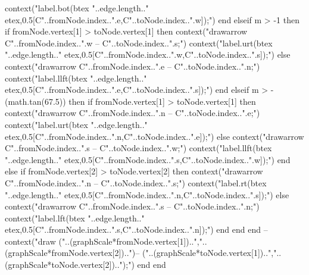					context("label.bot(btex "..edge.length.." etex,0.5[C"..fromNode.index..".e,C"..toNode.index..".w]);")
				end
			elseif m > -1 then
				if fromNode.vertex[1] > toNode.vertex[1] then
					context("drawarrow C"..fromNode.index..".w -- C"..toNode.index..".s;")
					context("label.urt(btex "..edge.length.." etex,0.5[C"..fromNode.index..".w,C"..toNode.index..".s]);")
				else
					context("drawarrow C"..fromNode.index..".e -- C"..toNode.index..".n;")
					context("label.llft(btex "..edge.length.." etex,0.5[C"..fromNode.index..".e,C"..toNode.index..".s]);")
				end
			elseif m > -(math.tan(67.5)) then
				if fromNode.vertex[1] > toNode.vertex[1] then
					context("drawarrow C"..fromNode.index..".n -- C"..toNode.index..".e;")
					context("label.urt(btex "..edge.length.." etex,0.5[C"..fromNode.index..".n,C"..toNode.index..".e]);")
				else
					context("drawarrow C"..fromNode.index..".s -- C"..toNode.index..".w;")
					context("label.llft(btex "..edge.length.." etex,0.5[C"..fromNode.index..".s,C"..toNode.index..".w]);")
				end
			else
				if fromNode.vertex[2] > toNode.vertex[2] then
					context("drawarrow C"..fromNode.index..".n -- C"..toNode.index..".s;")
					context("label.rt(btex "..edge.length.." etex,0.5[C"..fromNode.index..".n,C"..toNode.index..".s]);")
				else
					context("drawarrow C"..fromNode.index..".s -- C"..toNode.index..".n;")
					context("label.lft(btex "..edge.length.." etex,0.5[C"..fromNode.index..".s,C"..toNode.index..".n]);")
				end
			end
		end
		--context("draw ("..(graphScale*fromNode.vertex[1])..","..(graphScale*fromNode.vertex[2])..")-- ("..(graphScale*toNode.vertex[1])..","..(graphScale*toNode.vertex[2])..");")
	end
end

